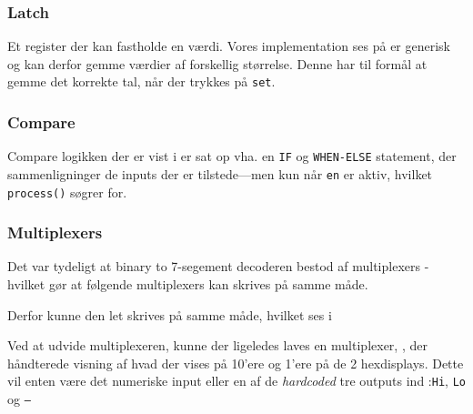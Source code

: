 {    

    \subsubsection*{Latch}
    Et register der kan fastholde en værdi. Vores implementation ses på  er generisk og kan derfor gemme værdier af forskellig størrelse. Denne har til formål at gemme det korrekte tal, når der trykkes på \texttt{set}.


    \subsubsection*{Compare}
    Compare logikken der er vist i  er sat op vha. en \texttt{IF} og \texttt{WHEN-ELSE} statement, der sammenligninger de inputs der er tilstede---men kun når \texttt{en} er aktiv, hvilket \texttt{process()} søgrer for.


    \subsubsection*{Multiplexers}
    Det var tydeligt at binary to 7-segement decoderen bestod af multiplexers - hvilket gør at følgende multiplexers kan skrives på samme måde.

    Derfor kunne den let skrives på samme måde, hvilket ses i 

    Ved at udvide multiplexeren, kunne der ligeledes laves en multiplexer, , der håndterede visning af hvad der vises på 10'ere og 1'ere på de 2 hexdisplays. Dette vil enten være det numeriske input eller en af de \emph{hardcoded} tre outputs ind :\texttt{Hi}, \texttt{Lo} og \texttt{--}

}

